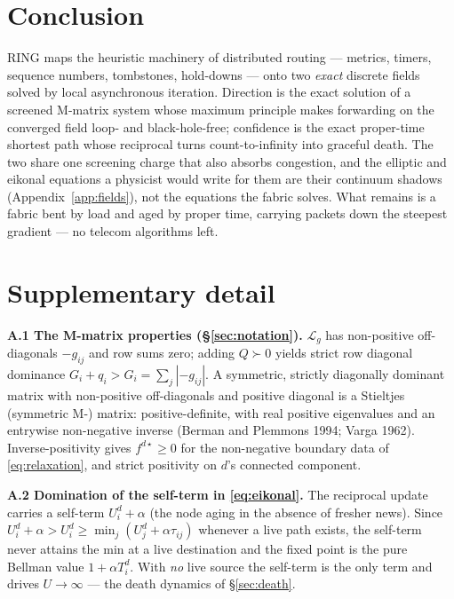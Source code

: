 \documentclass[11pt]{article}
\theoremstyle{plain}
\numberwithin{equation}{section}
\begin{document}
\section{Conclusion}\label{sec:conclusion}

RING maps the heuristic machinery of distributed routing — metrics, timers, sequence numbers, tombstones, hold-downs — onto two \emph{exact} discrete fields solved by local asynchronous iteration. Direction is the exact solution of a screened M-matrix system whose maximum principle makes forwarding on the converged field loop- and black-hole-free; confidence is the exact proper-time shortest path whose reciprocal turns count-to-infinity into graceful death. The two share one screening charge that also absorbs congestion, and the elliptic and eikonal equations a physicist would write for them are their continuum shadows (Appendix~\ref{app:fields}), not the equations the fabric solves. What remains is a fabric bent by load and aged by proper time, carrying packets down the steepest gradient — no telecom algorithms left.

\appendix
\section{Supplementary detail}\label{app:supplement}

\textbf{A.1 The M-matrix properties (§\ref{sec:notation}).} $\mathcal{L}_g$ has non-positive off-diagonals $-g_{ij}$ and row sums zero; adding $Q\succ0$ yields strict row diagonal dominance $G_i+q_i>G_i=\sum_{j}|{-g_{ij}}|$. A symmetric, strictly diagonally dominant matrix with non-positive off-diagonals and positive diagonal is a Stieltjes (symmetric M-) matrix: positive-definite, with real positive eigenvalues and an entrywise non-negative inverse (Berman and Plemmons 1994; Varga 1962). Inverse-positivity gives $f^{d\star}\ge 0$ for the non-negative boundary data of \eqref{eq:relaxation}, and strict positivity on $d$'s connected component.

\textbf{A.2 Domination of the self-term in \eqref{eq:eikonal}.} The reciprocal update carries a self-term $U^d_i+\alpha$ (the node aging in the absence of fresher news). Since $U^d_i+\alpha>U^d_i\ge\min_j(U^d_j+\alpha\tau_{ij})$ whenever a live path exists, the self-term never attains the min at a live destination and the fixed point is the pure Bellman value $1+\alpha T^d_i$. With \emph{no} live source the self-term is the only term and drives $U\to\infty$ — the death dynamics of §\ref{sec:death}.
\end{document}

